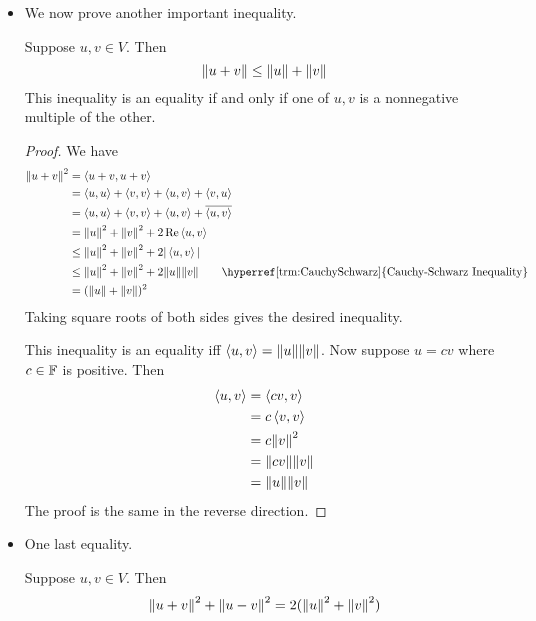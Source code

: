 \documentclass[../main.tex]{subfiles}
\begin{document}
\begin{itemize}
    \item We now prove another important inequality.
    \begin{theorem}
        Suppose $u,v\in V$. Then
        \begin{equation*}
            \norm{u+v} \leq \norm{u}+\norm{v}
        \end{equation*}
        This inequality is an equality if and only if one of $u,v$ is a nonnegative multiple of the other.
        \begin{proof}
            We have
            \begin{align*}
                \norm{u+v}^2 &= \inp{u+v}{u+v}\\
                &= \inp{u}{u}+\inp{v}{v}+\inp{u}{v}+\inp{v}{u}\\
                &= \inp{u}{u}+\inp{v}{v}+\inp{u}{v}+\overline{\inp{u}{v}}\\
                &= \norm{u}^2+\norm{v}^2+2\Re\inp{u}{v}\\
                &\leq \norm{u}^2+\norm{v}^2+2|\inp{u}{v}|\\
                &\leq \norm{u}^2+\norm{v}^2+2\norm{u}\norm{v}\tag*{\hyperref[trm:CauchySchwarz]{Cauchy-Schwarz Inequality}}\\
                &= (\norm{u}+\norm{v})^2
            \end{align*}
            Taking square roots of both sides gives the desired inequality.\par
            This inequality is an equality iff $\left\langle{u},{v}\right\rangle=\norm{u}\norm{v}$. Now suppose $u=cv$ where $c\in\mathbb{F}$ is positive. Then
            \begin{align*}
                \left\langle{u},{v}\right\rangle &= \left\langle{cv},{v}\right\rangle\\
                &= c\left\langle{v},{v}\right\rangle\\
                &= c\norm{v}^2\\
                &= \norm{cv}\norm{v}\\
                &= \norm{u}\norm{v}
            \end{align*}
            The proof is the same in the reverse direction.
        \end{proof}
    \end{theorem}
    \item One last equality.
    \begin{theorem}
        Suppose $u,v\in V$. Then
        \begin{equation*}
            \norm{u+v}^2+\norm{u-v}^2 = 2(\norm{u}^2+\norm{v}^2 )
        \end{equation*}
        \begin{figure}[h!]
            \centering
\end{figure}
\end{theorem}
\end{itemize}
\end{document}
